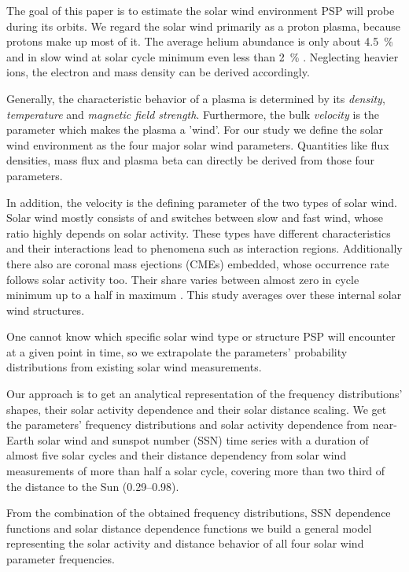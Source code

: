 The goal of this paper is to estimate the solar wind environment PSP will probe during its orbits. We regard the solar wind primarily as a proton plasma, because protons make up most of it. The average helium abundance is only about \SI{4.5}{\percent} and in slow wind at solar cycle minimum even less than \SI{2}{\percent} \citep{Feldman1978,Schwenn1983,Kasper2012}. Neglecting heavier ions, the electron and mass density can be derived accordingly.

Generally, the characteristic behavior of a plasma is determined by its \textit{density}, \textit{temperature} and \textit{magnetic field strength}. Furthermore, the bulk \textit{velocity} is the parameter which makes the plasma a 'wind'. For our study we define the solar wind environment as the four major solar wind parameters. Quantities like flux densities, mass flux and plasma beta can directly be derived from those four parameters.

In addition, the velocity is the defining parameter of the two types of solar wind. Solar wind mostly consists of and switches between slow and fast wind, whose ratio highly depends on solar activity. These types have different characteristics and their interactions lead to phenomena such as interaction regions. Additionally there also are coronal mass ejections (CMEs) embedded, whose occurrence rate follows solar activity too. Their share varies between almost zero in cycle minimum up to a half in maximum \citep{Richardson2012}. This study averages over these internal solar wind structures.

One cannot know which specific solar wind type or structure PSP will encounter at a given point in time, so we extrapolate the parameters' probability distributions from existing solar wind measurements.

Our approach is to get an analytical representation of the frequency distributions' shapes, their solar activity dependence and their solar distance scaling. We get the parameters' frequency distributions and solar activity dependence from near-Earth solar wind and sunspot number (SSN) time series with a duration of almost five solar cycles and their distance dependency from solar wind measurements of more than half a solar cycle, covering more than two third of the distance to the Sun (\SIrange{0.29}{0.98}{\au}).%

From the combination of the obtained frequency distributions, SSN dependence functions and solar distance dependence functions we build a general model representing the solar activity and distance behavior of all four solar wind parameter frequencies.

